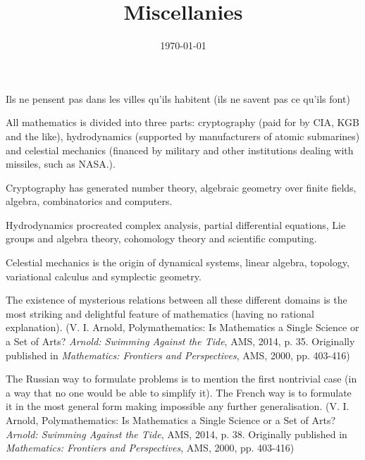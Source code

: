 \documentclass{article}
\title{Miscellanies}
\date{\today}
\begin{document}
\maketitle


Ils ne pensent pas dans les villes qu'ils habitent (ils ne savent pas ce qu'ils font)

\bigskip

All mathematics is divided into three parts: cryptography (paid for by CIA, KGB and the like), hydrodynamics (supported by manufacturers of atomic submarines) and celestial mechanics (financed by military and other institutions dealing with missiles, such as NASA.). 

Cryptography has generated number theory, algebraic geometry over finite fields, algebra, combinatorics and computers. 

Hydrodynamics procreated complex analysis, partial differential equations, Lie groups and algebra theory, cohomology theory and scientific computing. 

Celestial mechanics is the origin of dynamical systems, linear algebra, topology, variational calculus and symplectic geometry. 

The existence of mysterious relations between all these different domains is the most striking and delightful feature of mathematics (having no rational explanation). (V. I. Arnold, Polymathematics: Is Mathematics a Single Science or a Set of Arts? \textit{Arnold: Swimming Against the Tide}, AMS, 2014, p. 35. Originally published in \textit{Mathematics: Frontiers and Perspectives}, AMS, 2000, pp. 403-416)

\bigskip

The Russian way to formulate problems is to mention the first nontrivial case (in a way that no one would be able to simplify it). The French way is to formulate it in the most general form making impossible any further generalisation. (V. I. Arnold, Polymathematics: Is Mathematics a Single Science or a Set of Arts? \textit{Arnold: Swimming Against the Tide}, AMS, 2014, p. 38. Originally published in \textit{Mathematics: Frontiers and Perspectives}, AMS, 2000, pp. 403-416)
\end{document}
